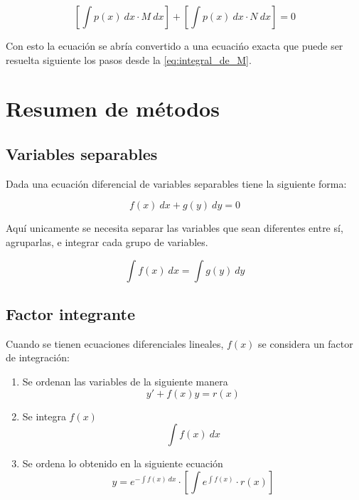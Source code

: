 \begin{equation*}
    \left[ \int{p(x) \ dx} \cdot M \ dx \right] + \left[ \int{p(x) \ dx} \cdot N \ dx \right] = 0
\end{equation*}

Con esto la ecuación se abría convertido a una ecuacińo exacta que puede ser resuelta siguiente los pasos desde la \autoref{eq:integral_de_M}.


    \newpage %


\section{Resumen de métodos}

\subsection{Variables separables}

Dada una ecuación diferencial de variables separables tiene la siguiente forma:

\begin{equation*}
    f(x) \ dx + g(y) \ dy = 0
\end{equation*}

Aquí unicamente se necesita separar las variables que sean diferentes entre sí, agruparlas, e integrar cada grupo de variables.

\begin{equation*}
    \int{f(x) \ dx} = \int{g(y) \ dy}
\end{equation*}

\subsection{Factor integrante}

Cuando se tienen ecuaciones diferenciales lineales, $f(x)$ se considera un factor de integración:

\begin{enumerate}
    \item Se ordenan las variables de la siguiente manera
        \begin{equation*}
            y' + f(x)y = r(x)
        \end{equation*}
        
    \item Se integra $f(x)$ 
        \begin{equation*}
            \int{f(x) \ dx}
        \end{equation*}
        
    \item Se ordena lo obtenido en la siguiente ecuación
        \begin{equation*}
            y=e^{-\int{f(x) \ dx}} \cdot \left[ \int{e^{\int{f(x)}}} \cdot r(x) \right]
        \end{equation*}
\end{enumerate}

